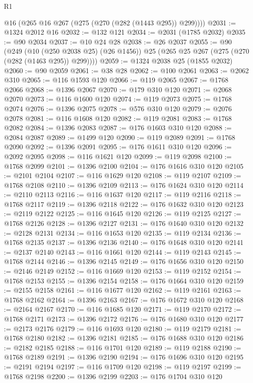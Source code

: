 \begin{lexlean}{R1}
\begin{coremodule}
      @16
      (@265 @16 @267 (@275 (@270 (@282 (@1443 @295)) @299))))
@2031 := @1324 @2012 @16
@2032 := @132 @121
@2034 := @2031 (@1785 @2032)
@2035 := @90 @2034
@2037 := @10 @24 @28
@2038 := @26 @2037
@2055 := @90
    (@249
      (@10 (@250 @2038 @25) (@26 @1456))
      @25
      (@265 @25 @267 (@275 (@270 (@282 (@1463 @295)) @299))))
@2059 := @1324 @2038 @25 (@1855 @2032)
@2060 := @90 @2059
@2061 := @38 @28
@2062 := @100 @2061
@2063 := @2062 @310
@2065 := @116 @1593 @120
@2066 := @119 @2065
@2067 := @1768 @2066
@2068 := @1396 @2067
@2070 := @179 @310 @120
@2071 := @2068 @2070
@2073 := @116 @1600 @120
@2074 := @119 @2073
@2075 := @1768 @2074
@2076 := @1396 @2075
@2078 := @576 @310 @120
@2079 := @2076 @2078
@2081 := @116 @1608 @120
@2082 := @119 @2081
@2083 := @1768 @2082
@2084 := @1396 @2083
@2087 := @176 @1603 @310 @120
@2088 := @2084 @2087
@2089 := @1499 @120
@2090 := @119 @2089
@2091 := @1768 @2090
@2092 := @1396 @2091
@2095 := @176 @1611 @310 @120
@2096 := @2092 @2095
@2098 := @116 @1621 @120
@2099 := @119 @2098
@2100 := @1768 @2099
@2101 := @1396 @2100
@2104 := @176 @1616 @310 @120
@2105 := @2101 @2104
@2107 := @116 @1629 @120
@2108 := @119 @2107
@2109 := @1768 @2108
@2110 := @1396 @2109
@2113 := @176 @1624 @310 @120
@2114 := @2110 @2113
@2116 := @116 @1637 @120
@2117 := @119 @2116
@2118 := @1768 @2117
@2119 := @1396 @2118
@2122 := @176 @1632 @310 @120
@2123 := @2119 @2122
@2125 := @116 @1645 @120
@2126 := @119 @2125
@2127 := @1768 @2126
@2128 := @1396 @2127
@2131 := @176 @1640 @310 @120
@2132 := @2128 @2131
@2134 := @116 @1653 @120
@2135 := @119 @2134
@2136 := @1768 @2135
@2137 := @1396 @2136
@2140 := @176 @1648 @310 @120
@2141 := @2137 @2140
@2143 := @116 @1661 @120
@2144 := @119 @2143
@2145 := @1768 @2144
@2146 := @1396 @2145
@2149 := @176 @1656 @310 @120
@2150 := @2146 @2149
@2152 := @116 @1669 @120
@2153 := @119 @2152
@2154 := @1768 @2153
@2155 := @1396 @2154
@2158 := @176 @1664 @310 @120
@2159 := @2155 @2158
@2161 := @116 @1677 @120
@2162 := @119 @2161
@2163 := @1768 @2162
@2164 := @1396 @2163
@2167 := @176 @1672 @310 @120
@2168 := @2164 @2167
@2170 := @116 @1685 @120
@2171 := @119 @2170
@2172 := @1768 @2171
@2173 := @1396 @2172
@2176 := @176 @1680 @310 @120
@2177 := @2173 @2176
@2179 := @116 @1693 @120
@2180 := @119 @2179
@2181 := @1768 @2180
@2182 := @1396 @2181
@2185 := @176 @1688 @310 @120
@2186 := @2182 @2185
@2188 := @116 @1701 @120
@2189 := @119 @2188
@2190 := @1768 @2189
@2191 := @1396 @2190
@2194 := @176 @1696 @310 @120
@2195 := @2191 @2194
@2197 := @116 @1709 @120
@2198 := @119 @2197
@2199 := @1768 @2198
@2200 := @1396 @2199
@2203 := @176 @1704 @310 @120

\end{coremodule}
\end{lexlean}

